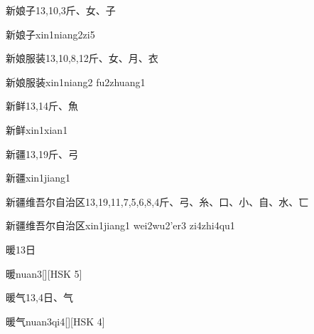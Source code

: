 \begin{Entry}{新娘子}{13,10,3}{⽄、⼥、⼦}
  \begin{Phonetics}{新娘子}{xin1niang2zi5}
  \end{Phonetics}
\end{Entry}

\begin{Entry}{新娘服装}{13,10,8,12}{⽄、⼥、⽉、⾐}
  \begin{Phonetics}{新娘服装}{xin1niang2 fu2zhuang1}
  \end{Phonetics}
\end{Entry}

\begin{Entry}{新鲜}{13,14}{⽄、⿂}
  \begin{Phonetics}{新鲜}{xin1xian1}
  \end{Phonetics}
\end{Entry}

\begin{Entry}{新疆}{13,19}{⽄、⼸}
  \begin{Phonetics}{新疆}{xin1jiang1}
  \end{Phonetics}
\end{Entry}

\begin{Entry}{新疆维吾尔自治区}{13,19,11,7,5,6,8,4}{⽄、⼸、⽷、⼝、⼩、⾃、⽔、⼖}
  \begin{Phonetics}{新疆维吾尔自治区}{xin1jiang1 wei2wu2'er3 zi4zhi4qu1}
  \end{Phonetics}
\end{Entry}

\begin{Entry}{暖}{13}{⽇}
  \begin{Phonetics}{暖}{nuan3}[][HSK 5]
  \end{Phonetics}
\end{Entry}

\begin{Entry}{暖气}{13,4}{⽇、⽓}
  \begin{Phonetics}{暖气}{nuan3qi4}[][HSK 4]
  \end{Phonetics}
\end{Entry}

